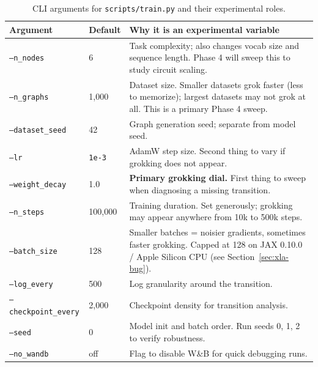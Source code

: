 \documentclass[11pt, a4paper]{article}
\begin{document}
\begin{table}[H]
\centering
\begin{tabular}{@{}llp{7.5cm}@{}}
\toprule
Argument & Default & Why it is an experimental variable \\
\midrule
\texttt{--n\_nodes}        & 6          & Task complexity; also changes vocab size and
                                          sequence length. Phase 4 will sweep this to
                                          study circuit scaling. \\
\texttt{--n\_graphs}       & 1{,}000    & Dataset size. Smaller datasets grok faster
                                          (less to memorize); largest datasets may not
                                          grok at all. This is a primary Phase 4 sweep. \\
\texttt{--dataset\_seed}   & 42         & Graph generation seed; separate from model seed. \\
\texttt{--lr}              & \texttt{1e-3} & AdamW step size. Second thing to vary if
                                             grokking does not appear. \\
\texttt{--weight\_decay}   & 1.0        & \textbf{Primary grokking dial.} First thing to
                                          sweep when diagnosing a missing transition. \\
\texttt{--n\_steps}        & 100{,}000  & Training duration. Set generously; grokking may
                                          appear anywhere from 10k to 500k steps. \\
\texttt{--batch\_size}     & 128        & Smaller batches = noisier gradients, sometimes
                                          faster grokking. Capped at 128 on
                                          JAX 0.10.0 / Apple Silicon CPU
                                          (see Section~\ref{sec:xla-bug}). \\
\texttt{--log\_every}      & 500        & Log granularity around the transition. \\
\texttt{--checkpoint\_every} & 2{,}000  & Checkpoint density for transition analysis. \\
\texttt{--seed}            & 0          & Model init and batch order. Run seeds 0, 1, 2
                                          to verify robustness. \\
\texttt{--no\_wandb}       & off        & Flag to disable W\&B for quick debugging runs. \\
\bottomrule
\end{tabular}
\caption{CLI arguments for \texttt{scripts/train.py} and their experimental roles.}
\end{table}
\end{document}
